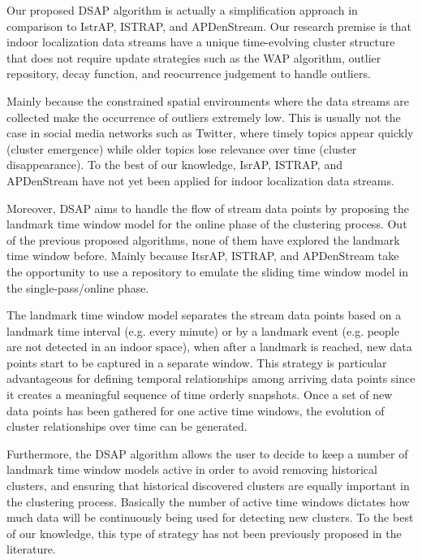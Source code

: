 Our proposed DSAP algorithm is actually a simplification approach in comparison to IstrAP, ISTRAP, and APDenStream. Our research premise is that indoor localization data streams have a unique time-evolving cluster structure that does not require update strategies such as the WAP algorithm, outlier repository, decay function, and reocurrence judgement to handle outliers. 

Mainly because the constrained spatial environments where the data streams are collected make the occurrence of outliers extremely low. This is usually not the case in social media networks such as Twitter, where timely topics appear quickly (cluster emergence) while older topics lose relevance over time (cluster disappearance). To the best of our knowledge, IsrAP, ISTRAP, and APDenStream have not yet been applied for indoor localization data streams. 

Moreover, DSAP aims to handle the flow of stream data points by proposing the landmark time window model for the online phase of the clustering process. Out of the previous proposed algorithms, none of them have explored the landmark time window before. Mainly because ItsrAP, ISTRAP, and APDenStream take the opportunity to use a repository to emulate the sliding time window model in the single-pass/online phase. 

The landmark time window model separates the stream data points based on a landmark time interval (e.g. every minute) or by a landmark event (e.g. people are not detected in an indoor space), when after a landmark is reached, new data points start to be captured in a separate window. This strategy is particular advantageous for defining temporal relationships among arriving data points since it creates a meaningful sequence of time orderly snapshots. Once a set of new data points has been gathered for one active time windows, the evolution of cluster relationships over time can be generated. 

Furthermore, the DSAP algorithm allows the user to decide to keep a number of landmark time window models active in order to avoid removing historical clusters, and ensuring that historical discovered clusters are equally important in the clustering process. Basically the number of active time windows dictates how much data will be continuously being used for detecting new clusters. To the best of our knowledge, this type of strategy has not been previously proposed in the literature.



